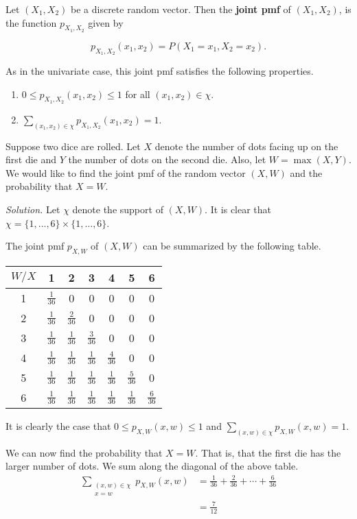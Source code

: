 \begin{definition}
	Let $(X_1,X_2)$ be a discrete random vector. Then the \textbf{joint pmf} of $(X_1,X_2)$, is the function $p_{X_1,X_2}$ given by

	$$p_{X_1,X_2}(x_1,x_2)=P(X_1=x_1,X_2=x_2).$$
\end{definition}

As in the univariate case, this joint pmf satisfies the following properties.
\begin{enumerate}
	\item $0\leq p_{X_1,X_2}(x_1,x_2)\leq 1$ for all $(x_1,x_2)\in\chi$.
	\item $\sum_{(x_1,x_2)\in\chi}p_{X_1,X_2}(x_1,x_2)=1$.
\end{enumerate}

\begin{example}[]
	Suppose two dice are rolled. Let $X$ denote the number of dots facing up on the first die and $Y$ the number of dots on the second die. Also, let $W=\max(X,Y)$. We would like to find the joint pmf of the random vector $(X,W)$ and the probability that $X=W$.

	\textit{Solution.} Let $\chi$ denote the support of $(X,W)$. It is clear that $\chi=\{1,\hdots,6\}\times\{1,\hdots,6\}$.

	The joint pmf $p_{X,W}$ of $(X,W)$ can be summarized by the following table.

	\begin{center}
	\begin{tabular}{c | c c c c c c}
		$W/X$ & 1 & 2 & 3 & 4 & 5 & 6\\\hline
		1 & $\frac{1}{36}$ & 0 & 0 & 0 & 0 & 0\\
		2 & $\frac{1}{36}$ & $\frac{2}{36}$ & 0 & 0 & 0 & 0\\
		3 & $\frac{1}{36}$ & $\frac{1}{36}$ & $\frac{3}{36}$ & 0 & 0 & 0\\
		4 & $\frac{1}{36}$ & $\frac{1}{36}$ & $\frac{1}{36}$ & $\frac{4}{36}$ & 0 & 0\\
		5 & $\frac{1}{36}$ & $\frac{1}{36}$ & $\frac{1}{36}$ & $\frac{1}{36}$ & $\frac{5}{36}$ & 0\\
		6 & $\frac{1}{36}$ & $\frac{1}{36}$ & $\frac{1}{36}$ & $\frac{1}{36}$ & $\frac{1}{36}$ & $\frac{6}{36}$
	\end{tabular}
	\end{center}

	It is clearly the case that $0\leq p_{X,W}(x,w)\leq 1$ and $\sum_{(x,w)\in\chi}p_{X,W}(x,w)=1$.

	We can now find the probability that $X=W$. That is, that the first die has the larger number of dots. We sum along the diagonal of the above table.
	\begin{align*}
		\sum_{\substack{(x,w)\in\chi\\x=w}}p_{X,W}(x,w)&=\frac 1{36}+\frac{2}{36}+\cdots+\frac{6}{36}\\
		&=\frac{7}{12}
	\end{align*}

\end{example}

